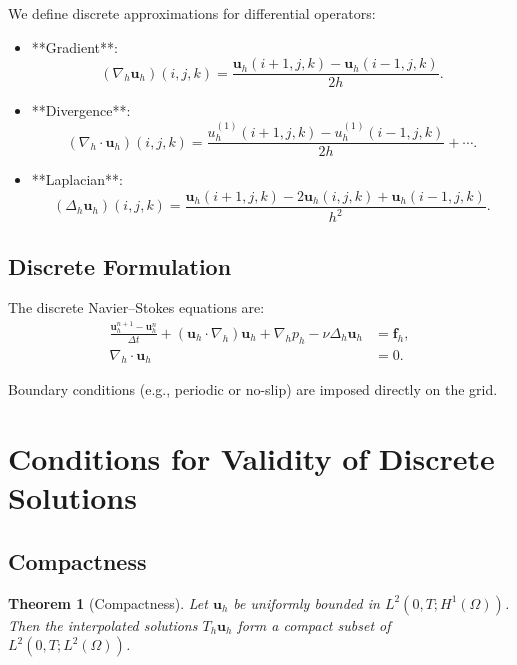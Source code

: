 \documentclass[12pt]{article}
\newtheorem{theorem}{Theorem}
\begin{document}
We define discrete approximations for differential operators:
\begin{itemize}
    \item **Gradient**:
    \begin{equation}
    (\nabla_h \mathbf{u}_h)(i,j,k) = \frac{\mathbf{u}_h(i+1,j,k) - \mathbf{u}_h(i-1,j,k)}{2h}.
    \end{equation}
    \item **Divergence**:
    \begin{equation}
    (\nabla_h \cdot \mathbf{u}_h)(i,j,k) = \frac{u_h^{(1)}(i+1,j,k) - u_h^{(1)}(i-1,j,k)}{2h} + \cdots.
    \end{equation}
    \item **Laplacian**:
    \begin{equation}
    (\Delta_h \mathbf{u}_h)(i,j,k) = \frac{\mathbf{u}_h(i+1,j,k) - 2\mathbf{u}_h(i,j,k) + \mathbf{u}_h(i-1,j,k)}{h^2}.
    \end{equation}
\end{itemize}

\subsection{Discrete Formulation}

The discrete Navier--Stokes equations are:
\begin{align}
\frac{\mathbf{u}_h^{n+1} - \mathbf{u}_h^n}{\Delta t} + (\mathbf{u}_h \cdot \nabla_h) \mathbf{u}_h + \nabla_h p_h - \nu \Delta_h \mathbf{u}_h &= \mathbf{f}_h, \label{eq:discrete-momentum} \\
\nabla_h \cdot \mathbf{u}_h &= 0. \label{eq:discrete-incompressibility}
\end{align}

Boundary conditions (e.g., periodic or no-slip) are imposed directly on the grid.

\section{Conditions for Validity of Discrete Solutions}

\subsection{Compactness}

\begin{theorem}[Compactness]
Let $\mathbf{u}_h$ be uniformly bounded in $L^2(0,T; H^1(\Omega))$. Then the interpolated solutions $T_h \mathbf{u}_h$ form a compact subset of $L^2(0,T; L^2(\Omega))$.
\end{theorem}
\end{document}
